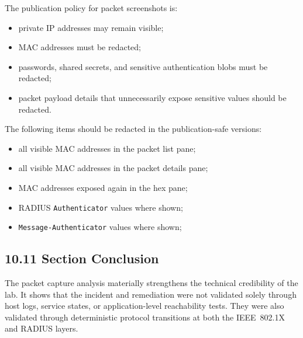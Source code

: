 \documentclass[11pt]{article}
\begin{document}
The publication policy for packet screenshots is:

\begin{itemize}
    \item private IP addresses may remain visible;
    \item MAC addresses must be redacted;
    \item passwords, shared secrets, and sensitive authentication blobs must be redacted;
    \item packet payload details that unnecessarily expose sensitive values should be redacted.
\end{itemize}

The following items should be redacted in the publication-safe versions:

\begin{itemize}
    \item all visible MAC addresses in the packet list pane;
    \item all visible MAC addresses in the packet details pane;
    \item MAC addresses exposed again in the hex pane;
    \item RADIUS \texttt{Authenticator} values where shown;
    \item \texttt{Message-Authenticator} values where shown;
\end{itemize}


\subsection{10.11 Section Conclusion}
\label{sec:section-10-conclusion}

The packet capture analysis materially strengthens the technical credibility of the lab. It shows that the incident and remediation were not validated solely through host logs, service states, or application-level reachability tests. They were also validated through deterministic protocol transitions at both the IEEE~802.1X and RADIUS layers.
\end{document}
